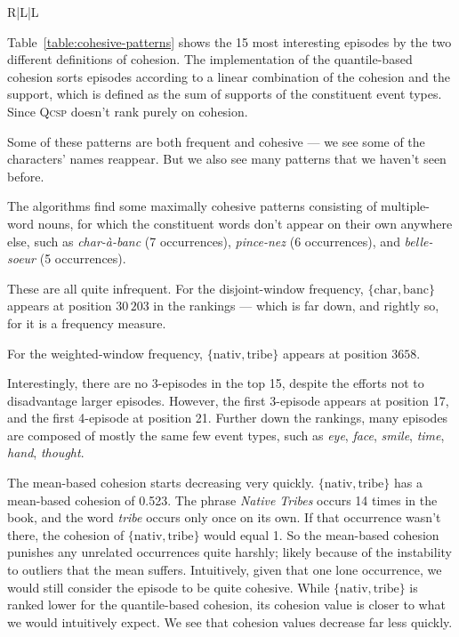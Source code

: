 \begin{table}
\begin{tabulary}{\textwidth}{R|L|L}
\end{tabulary}

\caption{The top 15 patterns mined from~\emph{tolstoy} using cohesion (\textsc{Fci}, minimum support 5, maximal size 5) and quantile-based cohesion (\textsc{Qcsp}, minimum support 5, maximal size 5, minimal-window width threshold 2).}
\label{table:cohesive-patterns}
\end{table}

Table~\ref{table:cohesive-patterns} shows the 15 most interesting episodes by the two different definitions of cohesion. The implementation of the quantile-based cohesion sorts episodes according to a linear combination of the cohesion and the support, which is defined as the sum of supports of the constituent event types. Since \textsc{Qcsp} doesn't rank purely on cohesion.

Some of these patterns are both frequent and cohesive --- we see some of the characters' names reappear. But we also see many patterns that we haven't seen before.

The algorithms find some maximally cohesive patterns consisting of multiple-word nouns, for which the constituent words don't appear on their own anywhere else, such as \emph{char-à-banc} (7 occurrences), \emph{pince-nez} (6 occurrences), and \emph{belle-soeur} (5 occurrences).

These are all quite infrequent. For the disjoint-window frequency, $ \{ \text{char},\allowbreak \text{banc} \} $ appears at position $ 30\,203 $ in the rankings --- which is far down, and rightly so, for it is a frequency measure.

For the weighted-window frequency, $ \{ \text{nativ}, \text{tribe} \} $ appears at position $ 3658 $.

Interestingly, there are no 3-episodes in the top 15, despite the efforts not to disadvantage larger episodes. However, the first 3-episode appears at position 17, and the first 4-episode at position 21. Further down the rankings, many episodes are composed of mostly the same few event types, such as \emph{eye}, \emph{face}, \emph{smile}, \emph{time}, \emph{hand}, \emph{thought}.

The mean-based cohesion starts decreasing very quickly. $ \{ \text{nativ}, \text{tribe} \} $ has a mean-based cohesion of 0.523. The phrase \emph{Native Tribes} occurs 14 times in the book, and the word \emph{tribe} occurs only once on its own. If that occurrence wasn't there, the cohesion of $ \{ \text{nativ}, \text{tribe} \} $ would equal 1. So the mean-based cohesion punishes any unrelated occurrences quite harshly; likely because of the instability to outliers that the mean suffers. Intuitively, given that one lone occurrence, we would still consider the episode to be quite cohesive. While $ \{ \text{nativ}, \text{tribe} \} $ is ranked lower for the quantile-based cohesion, its cohesion value is closer to what we would intuitively expect. We see that cohesion values decrease far less quickly.

